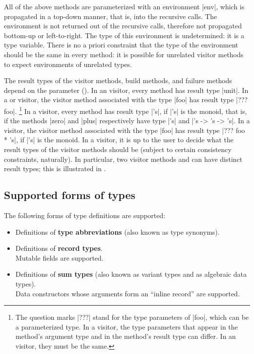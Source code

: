 \documentclass[11pt,a4paper,twoside]{article}
\renewcommand{\emph}[1]{\textbf{#1}}
\begin{document}
All of the above methods are parameterized with an environment \oc|env|, which
is propagated in a top-down manner, that is, into the recursive calls. The
environment is not returned out of the recursive calls, therefore not
propagated bottom-up or left-to-right. The type of this environment is
undetermined: it is a type variable.
There is no a priori constraint that the type of the environment should be
the same in every method: it is possible for unrelated visitor methods to
expect environments of unrelated types.

The result types of the visitor methods, build methods, and failure methods
depend on the parameter \variety (). In an \iter visitor,
every method has result type \oc|unit|. In a \map or \mapendo visitor, the
visitor method associated with the type \oc|foo| has result type \oc|??? foo|.%
%
\footnote{The question marks \oc|???| stand for the type parameters of \oc|foo|,
which can be a parameterized type. In a \map visitor, the type parameters that
appear in the method's argument type and in the method's result type can differ.
In an \mapendo visitor, they must be the same.}
%
In a \reduce visitor, every method has result type \oc|'s|, if \oc|'s| is the
monoid, that is, if the methods \oc|zero| and \oc|plus| respectively have type \oc|'s|
and \oc|'s -> 's -> 's|.
%
In a \mapreduce visitor, the visitor method associated with the type \oc|foo|
has result type \oc|??? foo * 's|, if \oc|'s| is the monoid.
%
In a \fold visitor, it is up to the user to decide what the result types of
the visitor methods should be (subject to certain consistency constraints,
naturally). In particular, two visitor methods  and
 can have distinct result types; this is illustrated
in .


\subsection{Supported forms of types}

The following forms of type definitions are supported:
\begin{itemize}
\item Definitions of \emph{type abbreviations} (also known as type synonyms).
\item Definitions of \emph{record types}. \\ Mutable fields are supported.
\item Definitions of \emph{sum types} (also known as variant types and as algebraic
  data types). \\ Data constructors whose arguments form an ``inline record'' are
  supported.
\end{itemize}
\end{document}
